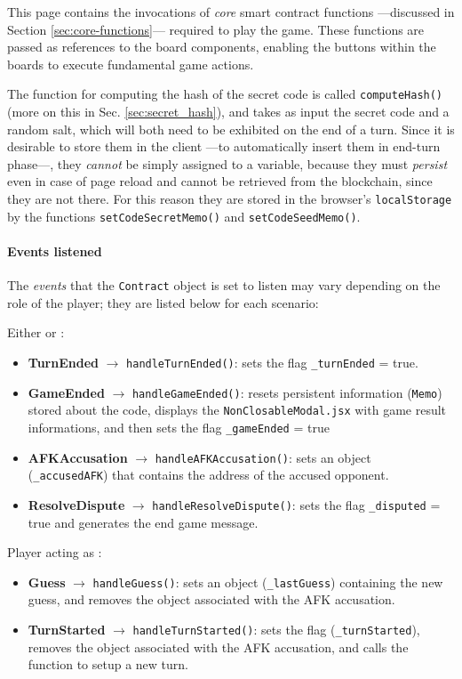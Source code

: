 This page contains the invocations of \textit{core} smart contract functions ---discussed in Section \ref{sec:core-functions}--- required to play the game. These functions are passed as references to the board components, enabling the buttons within the boards to execute fundamental game actions.

The function for computing the hash of the secret code is called \texttt{computeHash()} (more on this in Sec. \ref{sec:secret_hash}), and takes as input the secret code and a random salt, which will both need to be exhibited on the end of a turn.
Since it is desirable to store them in the client ---to automatically insert them in end-turn phase---, they \textit{cannot} be simply assigned to a variable, because they must \textit{persist} even in case of page reload and cannot be retrieved from the blockchain, since they are not there.
For this reason they are stored in the browser's \texttt{localStorage} by the functions \texttt{setCodeSecretMemo()} and \texttt{setCodeSeedMemo()}. 

\paragraph*{Events listened}

The \textit{events} that the \texttt{Contract} object is set to listen may vary depending on the role of the player; they are listed below for each scenario:

{Either  or :
\ns\begin{itemize}
    \item \textbf{TurnEnded} $\rightarrow$ \texttt{handleTurnEnded()}: sets the flag \texttt{\_turnEnded} = true.
    \item \textbf{GameEnded} $\rightarrow$ \texttt{handleGameEnded()}: resets persistent information (\texttt{Memo}) stored about the code, displays the \texttt{NonClosableModal.jsx} with game result informations, and then sets the flag \texttt{\_gameEnded} = true
    \item \textbf{AFKAccusation} $\rightarrow$ \texttt{handleAFKAccusation()}: sets an object (\texttt{\_accusedAFK}) that contains the address of the accused opponent.
    \item \textbf{ResolveDispute} $\rightarrow$ \texttt{handleResolveDispute()}: sets the flag \texttt{\_disputed} = true and generates the end game message.
\end{itemize}}

{Player acting as :
\ns\begin{itemize}
    \item \textbf{Guess} $\rightarrow$ \texttt{handleGuess()}: sets an object (\texttt{\_lastGuess}) containing the new guess, and removes the object associated with the AFK accusation.
    \item \textbf{TurnStarted} $\rightarrow$ \texttt{handleTurnStarted()}: sets the flag (\texttt{\_turnStarted}), removes the object associated with the AFK accusation, and calls the function to setup a new turn.
\end{itemize}}

